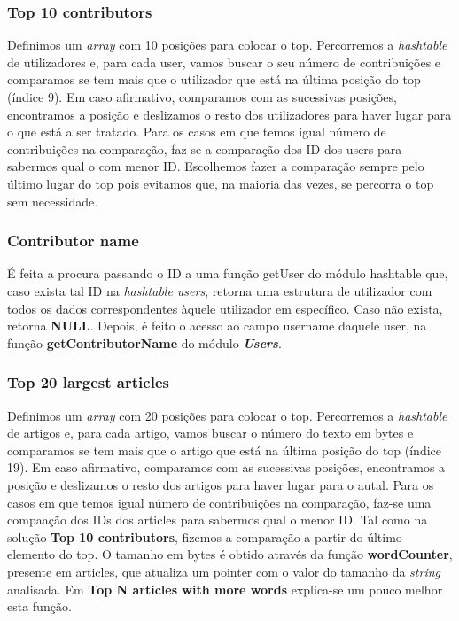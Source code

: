 \documentclass[a4paper]{article}
\begin{document}
\subsubsection{Top 10 contributors}
Definimos um \textit{array} com 10 posições para colocar o top. Percorremos a \textit{hashtable} de utilizadores e, para cada user, vamos buscar o seu número de contribuições e comparamos se tem mais que o utilizador que está na última posição do top (índice 9). Em caso afirmativo, comparamos com as sucessivas posições, encontramos a posição e deslizamos o resto dos utilizadores para haver lugar para o que está a ser tratado. Para os casos em que temos igual número de contribuições na comparação, faz-se a comparação dos ID dos users para sabermos qual o com menor ID.
Escolhemos fazer a comparação sempre pelo último lugar do top pois evitamos que, na maioria das vezes, se percorra o top sem necessidade.

\subsubsection{Contributor name}
É feita a procura passando o ID a uma função getUser do módulo hashtable que, caso exista tal ID na \textit{hashtable users}, retorna uma estrutura de utilizador com todos os dados correspondentes àquele utilizador em específico. Caso não exista, retorna \textbf{NULL}. Depois, é feito o acesso ao campo username daquele user, na função \textbf{getContributorName} do módulo \textbf{\textit{Users}}.

\subsubsection{Top 20 largest articles}
Definimos um \textit{array} com 20 posições para colocar o top. Percorremos a \textit{hashtable} de artigos e, para cada artigo, vamos buscar o número do texto em bytes e comparamos se tem mais que o artigo que está na última posição do top (índice 19). Em caso afirmativo, comparamos com as sucessivas posições, encontramos a posição e deslizamos o resto dos artigos para haver lugar para o autal. Para os casos em que temos igual número de contribuições na comparação, faz-se uma compaação dos IDs dos articles para sabermos qual o menor ID.
Tal como na solução \textbf{Top 10 contributors}, fizemos a comparação a partir do último elemento do top.
O tamanho em bytes é obtido através da função \textbf{wordCounter}, presente em articles, que atualiza um pointer com o valor do tamanho da \textit{string} analisada. Em \textbf{Top N articles with more words} explica-se um pouco melhor esta função.
\end{document}
